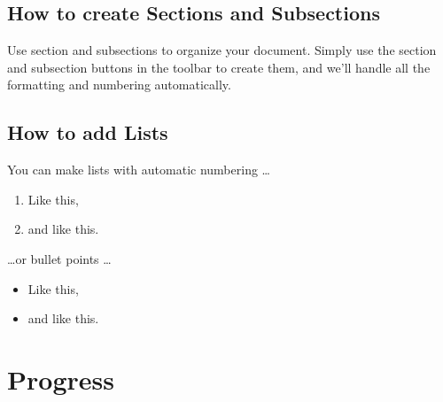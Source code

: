 \documentclass[a4paper]{article}
\begin{document}
\subsection{How to create Sections and Subsections}

Use section and subsections to organize your document. Simply use the section and subsection buttons in the toolbar to create them, and we'll handle all the formatting and numbering automatically.

\subsection{How to add Lists}

You can make lists with automatic numbering \dots

\begin{enumerate}
\item Like this,
\item and like this.
\end{enumerate}
\dots or bullet points \dots
\begin{itemize}
\item Like this,
\item and like this.
\end{itemize}

\section{Progress}
\end{document}
